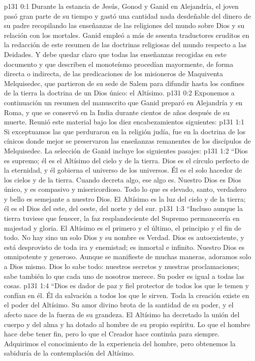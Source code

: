\author{Comisión de seres intermedios}
\vs p131 0:1 Durante la estancia de Jesús, Gonod y Ganid en Alejandría, el joven pasó gran parte de su tiempo y gastó una cantidad nada desdeñable del dinero de su padre recopilando las enseñanzas de las religiones del mundo sobre Dios y su relación con los mortales. Ganid empleó a más de sesenta traductores eruditos en la redacción de este resumen de las doctrinas religiosas del mundo respecto a las Deidades. Y debe quedar claro que todas las enseñanzas recogidas en este documento y que describen el monoteísmo procedían mayormente, de forma directa o indirecta, de las predicaciones de los misioneros de Maquiventa Melquisedec, que partieron de su sede de Salem para difundir hasta los confines de la tierra la doctrina de un Dios único: el Altísimo.
\vs p131 0:2 Exponemos a continuación un resumen del manuscrito que Ganid preparó en Alejandría y en Roma, y que se conservó en la India durante cientos de años después de su muerte. Reunió este material bajo los diez encabezamientos siguientes:
\vs p131 1:1 Si exceptuamos las que perduraron en la religión judía, fue en la doctrina de los cínicos donde mejor se preservaron las enseñanzas remanentes de los discípulos de Melquisedec. La selección de Ganid incluye los siguientes pasajes:
\vs p131 1:2 \pc “Dios es supremo; él es el Altísimo del cielo y de la tierra. Dios es el círculo perfecto de la eternidad, y él gobierna el universo de los universos. Él es el solo hacedor de los cielos y de la tierra. Cuando decreta algo, ese algo es. Nuestro Dios es Dios único, y es compasivo y misericordioso. Todo lo que es elevado, santo, verdadero y bello es semejante a nuestro Dios. El Altísimo es la luz del cielo y de la tierra; él es el Dios del este, del oeste, del norte y del sur.
\vs p131 1:3 “Incluso aunque la tierra tuviese que fenecer, la faz resplandeciente del Supremo permanecería en majestad y gloria. El Altísimo es el primero y el último, el principio y el fin de todo. No hay sino un solo Dios y su nombre es Verdad. Dios es autoexistente, y está desprovisto de toda ira y enemistad; es inmortal e infinito. Nuestro Dios es omnipotente y generoso. Aunque se manifieste de muchas maneras, adoramos solo a Dios mismo. Dios lo sabe todo: nuestros secretos y nuestras proclamaciones; sabe también lo que cada uno de nosotros merece. Su poder es igual a todas las cosas.
\vs p131 1:4 “Dios es dador de paz y fiel protector de todos los que le temen y confían en él. Él da salvación a todos los que le sirven. Toda la creación existe en el poder del Altísimo. Su amor divino brota de la santidad de su poder, y el afecto nace de la fuerza de su grandeza. El Altísimo ha decretado la unión del cuerpo y del alma y ha dotado al hombre de su propio espíritu. Lo que el hombre hace debe tener fin, pero lo que el Creador hace continúa para siempre. Adquirimos el conocimiento de la experiencia del hombre, pero obtenemos la sabiduría de la contemplación del Altísimo.
